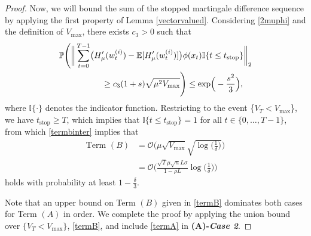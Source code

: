 \documentclass[letterpaper,10pt,conference]{ieeeconf}
\theoremstyle{plain} %
\theoremstyle{plain} %
\theoremstyle{plain} %
\theoremstyle{plain}
\begin{document}
\begin{proof}
Now, we will bound the sum of the stopped martingale difference sequence by applying the first property of Lemma \ref{vectorvalued}. Considering \eqref{2muphi} and the definition of $V_{\text{max}}$, there exists $c_3 >0$ such that
\begin{align}\label{termbinter}
  \nonumber & \mathbb{P}\Biggr(\biggr\| \sum_{t=0}^{T-1} \bigr(H_\mu'(w_t^{(i)}) - \mathbb{E}[H_\mu'(w_t^{(i)})] \bigr) \phi (x_t)\mathbb{I}\{t\le t_{\text{stop}}\}\biggr\|_2\\&\hspace{18mm}\ge c_3(1+s)  \sqrt{  \mu^2 V_{\text{max}}}\Biggr)\le \exp\Bigr(-\frac{s^2}{3}\Bigr),
\end{align}
where  $\mathbb{I}\{\cdot \}$ denotes the indicator function.
 Restricting to the event  \{$V_T<V_\text{max}$\}, we have $t_{\text{stop}}\ge T$, which implies that $\mathbb{I}\{t\le t_{\text{stop}}\}=1$ for all $t\in\{0,\dots, T-1\}$, from which
 \eqref{termbinter} implies that
\begin{align}\label{termB}
 \nonumber   \text{Term~} (B) &= \mathcal{O}\biggr(  \mu \sqrt{V_\text{max}} \sqrt{ \log\Bigr(\frac{1}{\delta}\Bigr)}\biggr) \\&= \mathcal{O}\Bigr(  \frac{\sqrt{T}\mu  \sqrt{n}L\sigma}{1-\rho L}\log\Bigr(\frac{1}{\delta}\Bigr)   \Big)
\end{align}
holds with probability at least $1-\frac{\delta}{3}$.




Note that an upper bound on Term $(B)$ given in \eqref{termB} dominates both cases for Term $(A)$ in order.  We complete the proof by applying the union bound over 
$\{V_T< V_\text{max}\}$, \eqref{termB},  and include \eqref{termA} in \textbf{(A)-\textit{Case 2}}. 
\end{proof}
\end{document}
